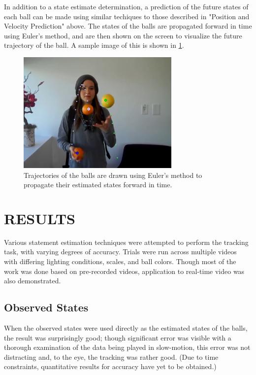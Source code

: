 \documentclass[letterpaper, 10 pt, conference]{ieeeconf}  %
\begin{document}
In addition to a state estimate determination, a prediction of the future states of each ball can be made using similar techiques to those described in "Position and Velocity Prediction" above. The states of the balls are propagated forward in time using Euler's method, and are then shown on the screen to visualize the future trajectory of the ball. A sample image of this is shown in \ref{fig:trajectories}.

\begin{figure}
\centering
    \includegraphics{trajectories.png}
    \caption{Trajectories of the balls are drawn using Euler's method to propagate their estimated states forward in time.}
    \label{fig:trajectories}
\end{figure}

\section{RESULTS}

Various statement estimation techniques were attempted to perform the tracking task, with varying degrees of accuracy. Trials were run across multiple videos with differing lighting conditions, scales, and ball colors. Though most of the work was done based on pre-recorded videos, application to real-time video was also demonstrated.

\subsection{Observed States}

When the observed states were used directly as the estimated states of the balls, the result was surprisingly good; though significant error was visible with a thorough examination of the data being played in slow-motion, this error was not distracting and, to the eye, the tracking was rather good. (Due to time constraints, quantitative results for accuracy have yet to be obtained.)
\end{document}
